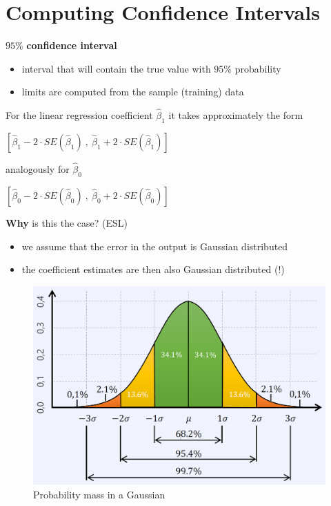 		\section{Computing Confidence Intervals}
			$95\%$ \textbf{confidence interval}
			\begin{itemize}
				\item interval that will contain the true value with $95\%$ probability
				\item limits are computed from the sample (training) data
			\end{itemize}
			For the linear regression coefficient $\hat{\beta}_1$ it takes approximately the form
			\begin{center}
				$[\hat{\beta}_1 - 2\cdot SE(\hat{\beta}_1)\ ,\ \hat{\beta}_1 + 2 \cdot SE(\hat{\beta}_1)]$
			\end{center}
			analogously for $\hat{\beta}_0$
			\begin{center}
				$[\hat{\beta}_0 - 2\cdot SE(\hat{\beta}_0)\ ,\ \hat{\beta}_0 + 2 \cdot SE(\hat{\beta}_0)]$
			\end{center}
			\textbf{Why} is this the case? (ESL)
			\begin{itemize}
				\item we assume that the error in the output is Gaussian distributed
				\item the coefficient estimates are then also Gaussian distributed (!)
			\end{itemize}
			
			\begin{figure}[ht]
				\centering
				\includegraphics[width=1\linewidth]{Graphics/LinearRegression/4.png}
				\caption{Probability mass in a Gaussian}
			\end{figure}































